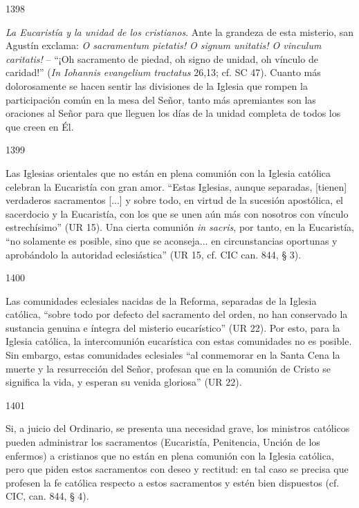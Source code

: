 			\begin{ccebody}\begin{ccenumber}1398\end{ccenumber} \textit{La Eucaristía y la unidad de los cristianos}. Ante la grandeza de esta misterio, san Agustín exclama: \textit{O sacramentum pietatis! O signum unitatis! O vinculum caritatis!} – “¡Oh sacramento de piedad, oh signo de unidad, oh vínculo de caridad!” (\textit{In Iohannis evangelium tractatus} 26,13; cf. SC 47). Cuanto más dolorosamente se hacen sentir las divisiones de la Iglesia que rompen la participación común en la mesa del Señor, tanto más apremiantes son las oraciones al Señor para que lleguen los días de la unidad completa de todos los que creen en Él.\end{ccebody}
			
			\begin{ccebody}\begin{ccenumber}1399\end{ccenumber} Las Iglesias orientales que no están en plena comunión con la Iglesia católica celebran la Eucaristía con gran amor. “Estas Iglesias, aunque separadas, [tienen] verdaderos sacramentos [...] y sobre todo, en virtud de la sucesión apostólica, el sacerdocio y la Eucaristía, con los que se unen aún más con nosotros con vínculo estrechísimo” (UR 15). Una cierta comunión \textit{in sacris}, por tanto, en la Eucaristía, “no solamente es posible, sino que se aconseja... en circunstancias oportunas y aprobándolo la autoridad eclesiástica” (UR 15, cf. CIC can. 844, § 3).\end{ccebody}
			
			\begin{ccebody}\begin{ccenumber}1400\end{ccenumber} Las comunidades eclesiales nacidas de la Reforma, separadas de la Iglesia católica, “sobre todo por defecto del sacramento del orden, no han conservado la sustancia genuina e íntegra del misterio eucarístico” (UR 22). Por esto, para la Iglesia católica, la intercomunión eucarística con estas comunidades no es posible. Sin embargo, estas comunidades eclesiales “al conmemorar en la Santa Cena la muerte y la resurrección del Señor, profesan que en la comunión de Cristo se significa la vida, y esperan su venida gloriosa” (UR 22).\end{ccebody}
			
			\begin{ccebody}\begin{ccenumber}1401\end{ccenumber} Si, a juicio del Ordinario, se presenta una necesidad grave, los ministros católicos pueden administrar los sacramentos (Eucaristía, Penitencia, Unción de los enfermos) a cristianos que no están en plena comunión con la Iglesia católica, pero que piden estos sacramentos con deseo y rectitud: en tal caso se precisa que profesen la fe católica respecto a estos sacramentos y estén bien dispuestos (cf. CIC, can. 844, § 4).\end{ccebody}
			
